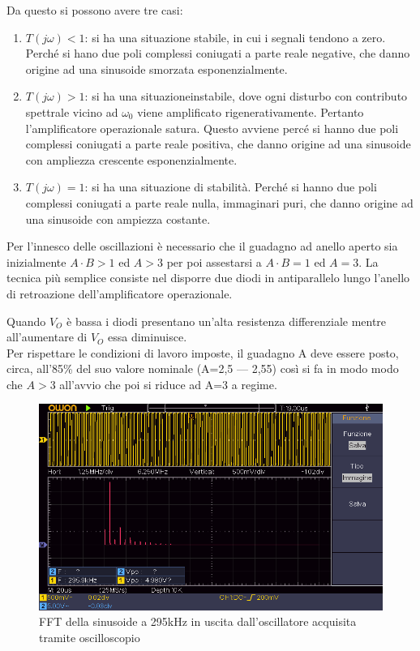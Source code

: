 \documentclass[titlepage]{report}
\begin{document}
	Da questo si possono avere tre casi:
	\begin{enumerate}
		\item \textit{$T(j\omega) < 1$}: si ha una situazione stabile, in cui i segnali tendono a zero. Perché si hano due poli complessi coniugati a parte reale negative, che danno origine ad una sinusoide smorzata esponenzialmente.
		\item \textit{$T(j\omega) > 1$}: si ha una situazioneinstabile, dove ogni disturbo con contributo spettrale vicino ad \textit{$\omega_0$} viene amplificato rigenerativamente. Pertanto l'amplificatore operazionale satura. Questo avviene percé si hanno due poli complessi coniugati a parte reale positiva, che danno origine ad una sinusoide con ampliezza crescente esponenzialmente.
		\item \textit{$T(j\omega) = 1$}: si ha una situazione di stabilità. Perché si hanno due poli complessi coniugati a parte reale nulla, immaginari puri, che danno origine ad una sinusoide con ampiezza costante.
	\end{enumerate}





	Per l'innesco delle oscillazioni è necessario che il guadagno ad anello aperto sia inizialmente $A\cdot B>1$ ed $A>3$ per poi assestarsi a $A\cdot B=1$ ed $A=3$. La tecnica più semplice consiste nel disporre due diodi in antiparallelo lungo l'anello di retroazione dell'amplificatore operazionale.
	
	\noindent Quando \textit{$V_{O}$} è bassa i diodi presentano un'alta resistenza differenziale mentre all'aumentare di \textit{$V_{O}$} essa diminuisce. 
	\\ Per rispettare le condizioni di lavoro imposte, il guadagno A deve essere posto, circa, all'85\% del suo valore nominale (A=2,5 — 2,55) così si fa in modo modo che $A>3$ all'avvio che poi si riduce ad A=3 a regime.

	\begin{figure}[H]
		\centering
		\includegraphics[scale=0.9]{Immagini/009_OscillatoreWienFFT.png}
		\caption{FFT della sinusoide a 295kHz in uscita dall'oscillatore acquisita tramite oscilloscopio}
		\label{fig:FFT295k}
	\end{figure}
	
\end{document}
